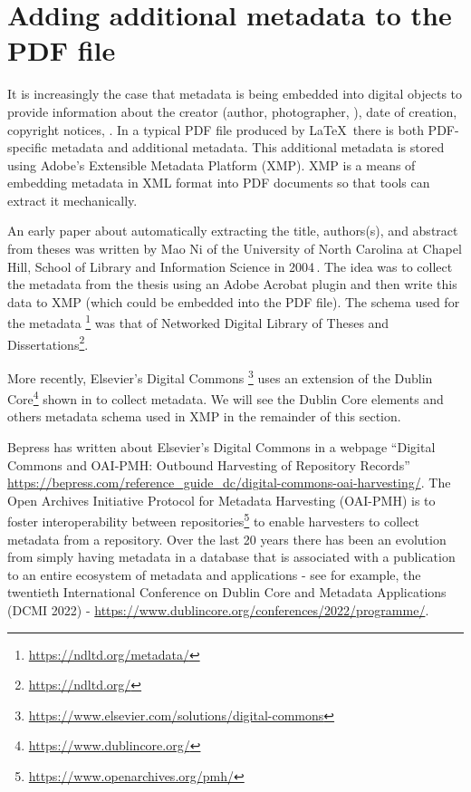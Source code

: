 \section{Adding additional metadata to the PDF file}
\label{sec:addingMetadataToPDFfile}
It is increasingly the case that metadata is being embedded into digital objects to provide information about the creator (author, photographer, \etc), date of creation, copyright notices, \etc. In a typical PDF file produced by \LaTeX~there is both PDF-specific metadata and additional metadata. This additional metadata is stored using Adobe's Extensible Metadata Platform (XMP). XMP is a means of embedding metadata in XML format into PDF documents so that tools can extract it mechanically.

An early paper about automatically extracting the title, authors(s), and abstract from theses was written by Mao Ni of the University of North Carolina at Chapel Hill, School of Library and Information Science in 2004\,\cite{Mao_Ni_2004}. The idea was to collect the metadata from the thesis using an Adobe Acrobat plugin and then write this data to XMP (which could be embedded into the PDF file). The schema used for the metadata\cite{hickey_pavani_suleman_2010} \footnote{\url{https://ndltd.org/metadata/}} was that of Networked Digital Library of Theses and Dissertations\footnote{\url{https://ndltd.org/}}.

More recently, Elsevier's Digital Commons \footnote{\url{https://www.elsevier.com/solutions/digital-commons}} uses an extension of the Dublin Core\footnote{\url{https://www.dublincore.org/}} shown in  to collect metadata. We will see the Dublin Core elements and others metadata schema used in XMP in the remainder of this section.

Bepress has written about Elsevier's Digital Commons in a webpage ``Digital Commons and OAI-PMH: Outbound Harvesting of Repository Records'' \url{https://bepress.com/reference_guide_dc/digital-commons-oai-harvesting/}. The Open Archives Initiative Protocol for Metadata Harvesting (OAI-PMH) is to foster interoperability between repositories\footnote{\url{https://www.openarchives.org/pmh/}} to enable harvesters to collect metadata from a repository. Over the last 20 years there has been an evolution from simply having metadata in a database that is associated with a publication to an entire ecosystem of metadata and applications - see for example, the twentieth International Conference on Dublin Core and Metadata Applications (DCMI 2022) - \url{https://www.dublincore.org/conferences/2022/programme/}.
\clearpage

